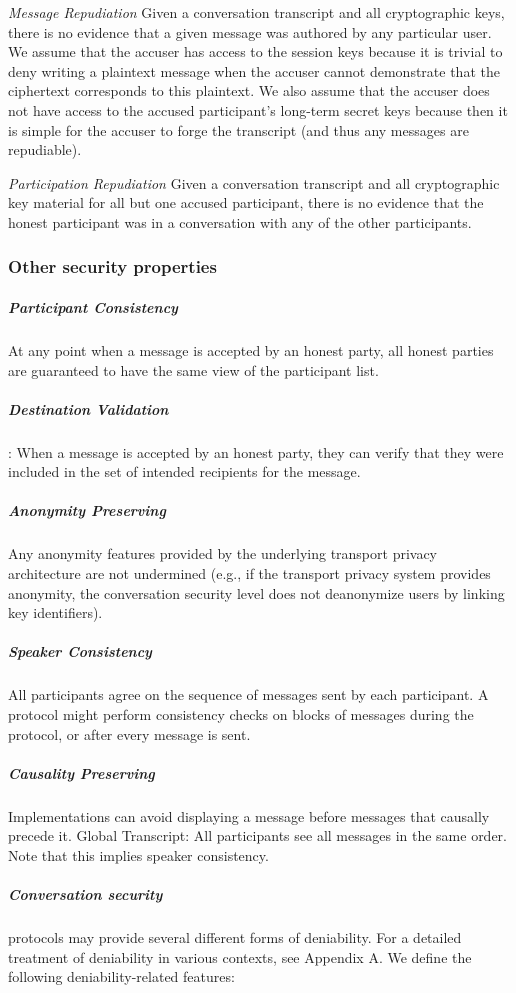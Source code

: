 \emph{Message Repudiation} Given a conversation transcript and all cryptographic keys, there is no evidence that a given message was authored by any particular user. We assume that the accuser has access to the session keys because it is trivial to deny writing a plaintext message when the accuser cannot demonstrate that the ciphertext corresponds to this plaintext. We also assume that the accuser does not have access to the accused participant’s long-term secret keys because then it is simple for the accuser to forge the transcript (and thus any messages are repudiable).


\emph{Participation Repudiation} Given a conversation transcript and all cryptographic key material for all but one accused participant, there is no evidence that the honest participant was in a conversation with any of the other participants.



\subsubsection{Other security properties}


\subparagraph{Participant Consistency} At any point when a message is accepted by an honest party, all honest parties are guaranteed to have the same view of the participant list.

\subparagraph{Destination Validation}: When a message is accepted by an honest party, they can verify that they were included in the set of intended recipients for the message.


\subparagraph{Anonymity Preserving} Any anonymity features provided by the underlying transport privacy architecture are not undermined (e.g., if the transport privacy system provides anonymity, the conversation security level does not deanonymize users by linking key identifiers).

\subparagraph{Speaker Consistency} All participants agree on the sequence of messages sent by each participant. A protocol might perform consistency checks on blocks of messages during the protocol, or after every message is sent.

\subparagraph{Causality Preserving} Implementations can avoid displaying a message before messages that causally precede it. Global Transcript: All participants see all messages in the same order. Note that this implies speaker consistency.


\subparagraph{Conversation security} protocols may provide several different forms of deniability. For a detailed treatment of deniability in various contexts, see Appendix A. We define the following deniability-related features:


